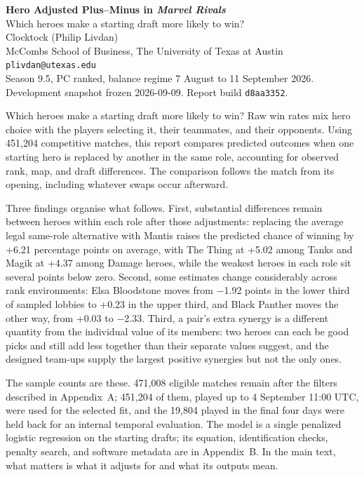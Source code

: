 \documentclass[11pt]{article}
\begin{document}
\begin{center}
{\Large\bfseries Hero Adjusted Plus--Minus in \emph{Marvel Rivals}}\\[4pt]
{\large Which heroes make a starting draft more likely to win?}\\[10pt]
{\normalsize Clocktock (Philip Livdan)}\\[2pt]
{\small McCombs School of Business, The University of Texas at Austin}\\
{\small\texttt{plivdan@utexas.edu}}\\[8pt]
{\small Season 9.5, PC ranked, balance regime 7 August to 11 September 2026. Development snapshot frozen 2026-09-09. Report build \texttt{d8aa3352}.}
\end{center}

\vspace{6pt}
\noindent Which heroes make a starting draft more likely to win? Raw win rates mix hero choice with the
players selecting it, their teammates, and their opponents. Using 451,204 competitive matches, this
report compares predicted outcomes when one starting hero is replaced by another in the same role,
accounting for observed rank, map, and draft differences. The comparison follows the match from its
opening, including whatever swaps occur afterward.

Three findings organise what follows. First, substantial differences remain between heroes within each
role after those adjustments: replacing the average legal same-role alternative with Mantis raises the
predicted chance of winning by +6.21 percentage points on average, with The Thing at +5.02
among Tanks and Magik at +4.37 among Damage heroes, while the weakest heroes in each role sit
several points below zero. Second, some estimates change considerably across rank environments: Elsa
Bloodstone moves from $-$1.92 points in the lower third of sampled lobbies to +0.23 in the
upper third, and Black Panther moves the other way, from +0.03 to $-$2.33. Third, a pair's extra
synergy is a different quantity from the individual value of its members: two heroes can each be good
picks and still add less together than their separate values suggest, and the designed team-ups supply
the largest positive synergies but not the only ones.

The sample counts are these. 471,008 eligible matches remain after the filters described in
Appendix~A; 451,204 of them, played up to 4 September 11:00 UTC, were used for the selected fit, and the
19,804 played in the final four days were held back for an internal temporal evaluation. The model is a
single penalized logistic regression on the starting drafts; its equation, identification checks,
penalty search, and software metadata are in Appendix~B. In the main text, what matters is what it
adjusts for and what its outputs mean.
\end{document}
